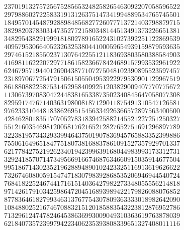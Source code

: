\begin{ProjectEuler}{13}
\begin{multicols}{2}
\begin{align*}
	23701913275725675285653248258265463092207058596522 \\
	29798860272258331913126375147341994889534765745501 \\
	18495701454879288984856827726077713721403798879715 \\
	38298203783031473527721580348144513491373226651381 \\
	34829543829199918180278916522431027392251122869539 \\
	40957953066405232632538044100059654939159879593635 \\
	29746152185502371307642255121183693803580388584903 \\
	41698116222072977186158236678424689157993532961922 \\
	62467957194401269043877107275048102390895523597457 \\
	23189706772547915061505504953922979530901129967519 \\
	86188088225875314529584099251203829009407770775672 \\
	11306739708304724483816533873502340845647058077308 \\
	82959174767140363198008187129011875491310547126581 \\
	97623331044818386269515456334926366572897563400500 \\
	42846280183517070527831839425882145521227251250327 \\
	55121603546981200581762165212827652751691296897789 \\
	32238195734329339946437501907836945765883352399886 \\
	75506164965184775180738168837861091527357929701337 \\
	62177842752192623401942399639168044983993173312731 \\
	32924185707147349566916674687634660915035914677504 \\
	99518671430235219628894890102423325116913619626622 \\
	73267460800591547471830798392868535206946944540724 \\
	76841822524674417161514036427982273348055556214818 \\
	97142617910342598647204516893989422179826088076852 \\
	87783646182799346313767754307809363333018982642090 \\
	10848802521674670883215120185883543223812876952786 \\
	71329612474782464538636993009049310363619763878039 \\
	62184073572399794223406235393808339651327408011116 \\

\end{align*}
\end{multicols}
\end{ProjectEuler}
